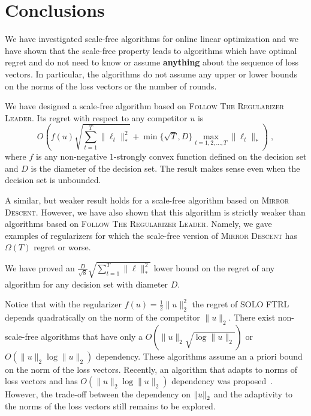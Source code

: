 \section{Conclusions}
\label{section:conclusions}

We have investigated scale-free algorithms for online linear optimization and
we have shown that the scale-free property leads to algorithms which have optimal
regret and do not need to know or assume \textbf{anything} about the sequence
of loss vectors. In particular, the algorithms do not assume any upper or lower
bounds on the norms of the loss vectors or the number of rounds.

We have designed a scale-free algorithm based on \textsc{Follow The Regularizer
Leader}. Its regret with respect to any competitor $u$ is
$$
O \left(f(u) \sqrt{\sum_{t=1}^T \|\ell_t\|_*^2}
+ \min\{\sqrt{T}, D\} \max_{t=1,2,\dots,T} \|\ell_t\|_* \right) \; ,
$$
where $f$ is any non-negative $1$-strongly convex
function defined on the decision set and $D$ is the diameter of the decision
set. The result makes sense even when the decision set is unbounded.

A similar, but weaker result holds for a scale-free algorithm based on
\textsc{Mirror Descent}. However, we have also shown that this algorithm is
strictly weaker than algorithms based on \textsc{Follow The Regularizer Leader}.
Namely, we gave examples of regularizers for which the scale-free version of
\textsc{Mirror Descent} has $\Omega(T)$ regret or worse.

We have proved an $\frac{D}{\sqrt{8}} \sqrt{\sum_{t=1}^T \|\ell\|_*^2}$ lower
bound on the regret of any algorithm for any decision set with diameter $D$.

Notice that with the regularizer $f(u) = \frac{1}{2}\|u\|_2^2$ the regret of
\textsc{SOLO FTRL} depends quadratically on the norm of the competitor
$\|u\|_2$. There exist non-scale-free algorithms \cite{McMahan-Streeter-2012,
McMahan-Abernethy-2013, Orabona-2013, McMahan-Orabona-2014, Orabona-2014,
Orabona-Pal-2016} that have only a $O(\|u\|_2 \sqrt{\log \|u\|_2})$ or
$O(\|u\|_2 \log \|u\|_2)$ dependency.  These algorithms assume an a priori bound
on the norm of the loss vectors. Recently, an algorithm that adapts to norms of
loss vectors and has $O(\|u\|_2 \log \|u\|_2)$ dependency was
proposed~\cite{Cutkosky-Boahen-2016}. However, the trade-off between the
dependency on ${\left\|{u}\right\|}_2$ and the adaptivity to the norms of the loss vectors
still remains to be explored.
